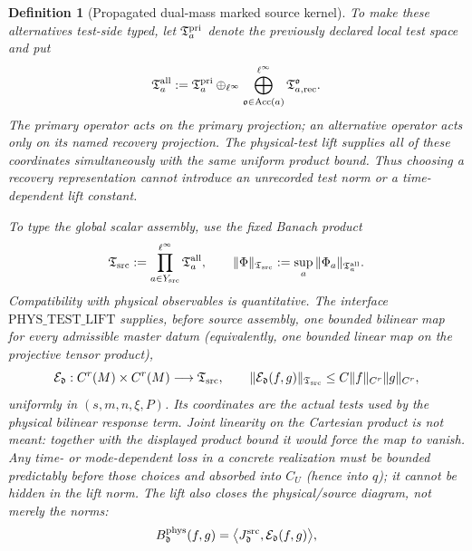 \documentclass[11pt]{article}
\newtheorem{definition}[theorem]{Definition}
\begin{document}
\begin{definition}[Propagated dual-mass marked source kernel]
To make these alternatives test-side typed, let
$\mathfrak T_{a}^{\rm pri}$ denote the previously declared local test
space and put
\begin{equation}
\label{eq:all-recovery-test-coordinates}
 \mathfrak T_a^{\rm all}:=
 \mathfrak T_a^{\rm pri}\oplus_{\ell^\infty}
 \bigoplus_{\mathfrak o\in\operatorname{Acc}(a)}^{\ell^\infty}
       \mathfrak T_{a,\rm rec}^{\mathfrak o}.
\end{equation}
The primary operator acts on the primary projection; an alternative
operator acts only on its named recovery projection.  The physical-test
lift supplies all of these coordinates simultaneously with the same
uniform product bound.  Thus choosing a recovery representation cannot
introduce an unrecorded test norm or a time-dependent lift constant.

To type the global scalar assembly, use the fixed Banach product
\begin{equation}
\label{eq:global-source-test-space}
 \mathfrak T_{\rm src}:=
 \prod_{a\in Y_{\rm src}}^{\ell^\infty}\mathfrak T_a^{\rm all},
 \qquad
 \|\Phi\|_{\mathfrak T_{\rm src}}
 :=\sup_a\|\Phi_a\|_{\mathfrak T_a^{\rm all}}.
\end{equation}
Compatibility with physical observables is quantitative.  The interface
$\mathrm{PHYS\_TEST\_LIFT}$ supplies, before source assembly, one bounded
bilinear map for every admissible master datum (equivalently, one bounded
linear map on the projective tensor product),
\begin{equation}
\label{eq:bounded-physical-test-lift}
 \mathcal E_{\mathfrak d}:C^r(M)\times C^r(M)
       \longrightarrow\mathfrak T_{\rm src},\qquad
 \|\mathcal E_{\mathfrak d}(f,g)\|_{\mathfrak T_{\rm src}}
 \le C\|f\|_{C^r}\|g\|_{C^r},
\end{equation}
uniformly in $(s,m,n,\xi,P)$.  Its coordinates are the actual tests used by
the physical bilinear response term.  Joint linearity on the Cartesian
product is not meant: together with the displayed product bound it would
force the map to vanish.  Any time- or mode-dependent loss in a concrete
realization must be bounded predictably before those choices and absorbed
into $C_U$ (hence into $q$); it cannot be hidden in the lift norm.
The lift also closes the physical/source diagram, not merely the norms:
\begin{equation}
\label{eq:physical-test-lift-commutation}
 B_{\mathfrak d}^{\rm phys}(f,g)
 =\big\langle J_{\mathfrak d}^{\rm src},
       \mathcal E_{\mathfrak d}(f,g)\big\rangle,
\end{equation}

\end{definition}
\end{document}
